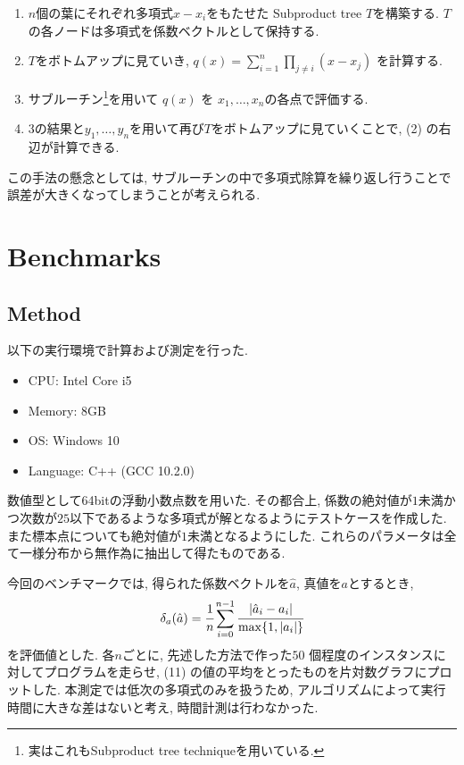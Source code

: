 \documentclass[uplatex,dvipdfmx,titlepage]{jsarticle}
\begin{document}
  \begin{enumerate}
    \item $n$個の葉にそれぞれ多項式$x-x_i$をもたせた Subproduct tree $T$を構築する. $T$の各ノードは多項式を係数ベクトルとして保持する.
    \item $T$をボトムアップに見ていき, $q(x) = \displaystyle\sum_{i=1}^n\prod_{j\neq i}(x-x_j)$ を計算する.
    \item サブルーチン\footnote{実はこれもSubproduct tree techniqueを用いている.}を用いて $q(x)$ を $x_1, \ldots, x_n$の各点で評価する.
    \item 3の結果と$y_1, \ldots, y_n$を用いて再び$T$をボトムアップに見ていくことで, (2) の右辺が計算できる.
  \end{enumerate}

  この手法の懸念としては, サブルーチンの中で多項式除算を繰り返し行うことで誤差が大きくなってしまうことが考えられる.

  \section{Benchmarks}
  \subsection{Method}
  以下の実行環境で計算および測定を行った.
  \begin{itemize}
    \item CPU: Intel Core i5
    \item Memory: 8GB
    \item OS: Windows 10
    \item Language: C++ (GCC 10.2.0)
  \end{itemize}

  数値型として64bitの浮動小数点数を用いた.
  その都合上, 係数の絶対値が$1$未満かつ次数が$25$以下であるような多項式が解となるようにテストケースを作成した.
  また標本点についても絶対値が$1$未満となるようにした.
  これらのパラメータは全て一様分布から無作為に抽出して得たものである.

  今回のベンチマークでは, 得られた係数ベクトルを$\hat{a}$, 真値を$a$とするとき,
  \begin{eqnarray}
    \delta_a(\hat{a}) = \cfrac{1}{n}\sum_{i=0}^{n-1}\cfrac{|\hat{a}_i - a_i|}{\max\{1, |a_i|\}}
  \end{eqnarray}
  を評価値とした.
  各$n$ごとに, 先述した方法で作った$50$ 個程度のインスタンスに対してプログラムを走らせ, (11) の値の平均をとったものを片対数グラフにプロットした.
  本測定では低次の多項式のみを扱うため, アルゴリズムによって実行時間に大きな差はないと考え, 時間計測は行わなかった.
\end{document}
